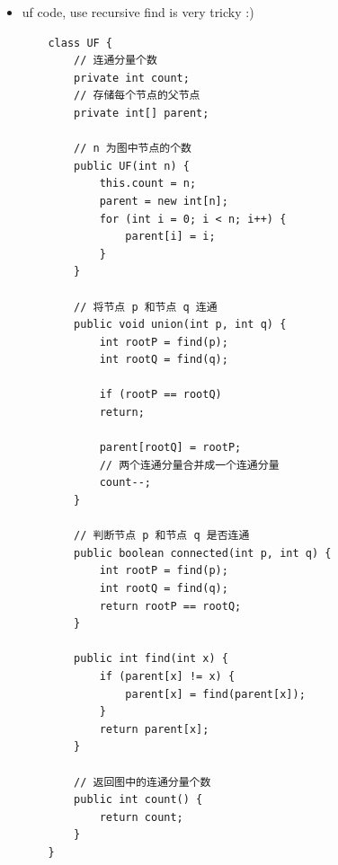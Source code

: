 \documentclass[a4paper,11pt,twoside]{book}
\begin{document}
\begin{itemize}
\begin{lstlisting}
// 定义：将子数组 nums[lo..hi] 进行排序
private static void sort(int[] nums, int lo, int hi) {
	if (lo == hi) {
		// 单个元素不用排序
		return;
	}
	// 这样写是为了防止溢出，效果等同于 (hi + lo) / 2
	int mid = lo + (hi - lo) / 2;
	// 先对左半部分数组 nums[lo..mid] 排序
	sort(nums, lo, mid);
	// 再对右半部分数组 nums[mid+1..hi] 排序
	sort(nums, mid + 1, hi);
	// 将两部分有序数组合并成一个有序数组
	merge(nums, lo, mid, hi);
}

// 将 nums[lo..mid] 和 nums[mid+1..hi] 这两个有序数组合并成一个有序数组
private static void merge(int[] nums, int lo, int mid, int hi) {
	// 先把 nums[lo..hi] 复制到辅助数组中
	// 以便合并后的结果能够直接存入 nums
	for (int i = lo; i <= hi; i++) {
		temp[i] = nums[i];
	}
	
	// 数组双指针技巧，合并两个有序数组
	int i = lo, j = mid + 1;
	for (int p = lo; p <= hi; p++) {
		if (i == mid + 1) {
			// 左半边数组已全部被合并
			nums[p] = temp[j++];
		} else if (j == hi + 1) {
			// 右半边数组已全部被合并
			nums[p] = temp[i++];
		} else if (temp[i] > temp[j]) {
			nums[p] = temp[j++];
		} else {
			nums[p] = temp[i++];
		}
	}
}
}
\end{lstlisting}

	\item uf code, use recursive find is very tricky :)
\begin{lstlisting}
	class UF {
		// 连通分量个数
		private int count;
		// 存储每个节点的父节点
		private int[] parent;
		
		// n 为图中节点的个数
		public UF(int n) {
			this.count = n;
			parent = new int[n];
			for (int i = 0; i < n; i++) {
				parent[i] = i;
			}
		}
		
		// 将节点 p 和节点 q 连通
		public void union(int p, int q) {
			int rootP = find(p);
			int rootQ = find(q);
			
			if (rootP == rootQ)
			return;
			
			parent[rootQ] = rootP;
			// 两个连通分量合并成一个连通分量
			count--;
		}
		
		// 判断节点 p 和节点 q 是否连通
		public boolean connected(int p, int q) {
			int rootP = find(p);
			int rootQ = find(q);
			return rootP == rootQ;
		}
		
		public int find(int x) {
			if (parent[x] != x) {
				parent[x] = find(parent[x]);
			}
			return parent[x];
		}
		
		// 返回图中的连通分量个数
		public int count() {
			return count;
		}
	}
\end{lstlisting}



\end{itemize}
\end{document}
